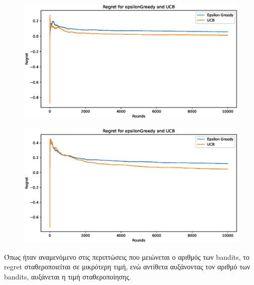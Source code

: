 \begin{figure}[h]
	\centering
	\begin{minipage}{.4\textwidth}
		\centering
		\includegraphics[width=0.9\linewidth]{Images/Regret5_10000.eps}
		\label{fig:epsilon_10001}
	\end{minipage}
	\begin{minipage}{.4\textwidth}
		\centering
		\includegraphics[width=0.9\linewidth]{Images/Regret20_10000.eps}
		\label{fig:epsilon_15000}
	\end{minipage}
\end{figure}

\noindent
Όπως ήταν αναμενόμενο στις περιπτώσεις που μειώνεται ο αριθμός των bandits, το regret σταθεροποιείται σε μικρότερη τιμή, ενώ αντίθετα αυξάνοντας τον αριθμό των bandits, αυξάνεται η τιμή σταθεροποίησης.